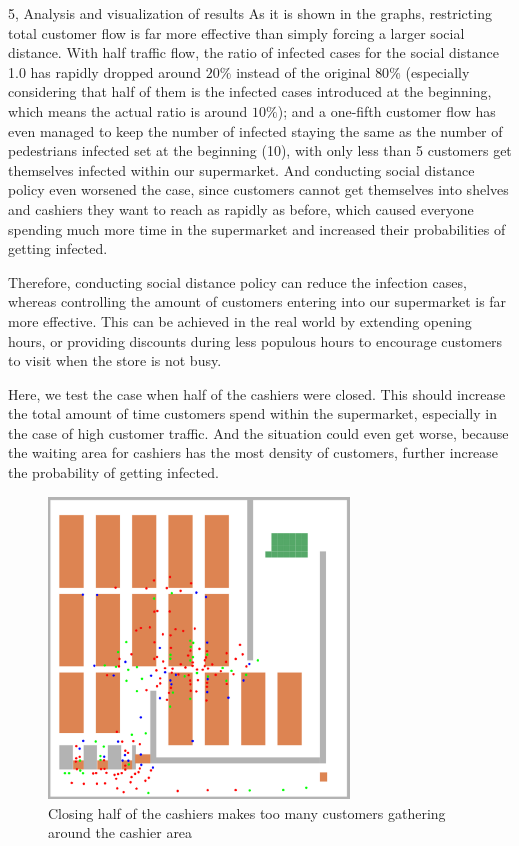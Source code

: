 \documentclass[10pt,a4paper]{article}
\begin{document}
\begin{task}{5, Analysis and visualization of results}
As it is shown in the graphs, restricting total customer flow is far more effective than simply forcing a larger social distance. With half traffic flow, the ratio of infected cases for the social distance 1.0 has rapidly dropped around $20\%$ instead of the original $80\%$ (especially considering that half of them is the infected cases introduced at the beginning, which means the actual ratio is around $10\%$); and a one-fifth customer flow has even managed to keep the number of infected staying the same as the number of pedestrians infected set at the beginning (10), with only less than 5 customers get themselves infected within our supermarket. And conducting social distance policy even worsened the case, since customers cannot get themselves into shelves and cashiers they want to reach as rapidly as before, which caused everyone spending much more time in the supermarket and increased their probabilities of getting infected.

Therefore, conducting social distance policy can reduce the infection cases, whereas controlling the amount of customers entering into our supermarket is far more effective. This can be achieved in the real world by extending opening hours, or providing discounts during less populous hours to encourage customers to visit when the store is not busy.

\bigskip


Here, we test the case when half of the cashiers were closed. This should increase the total amount of time customers spend within the supermarket, especially in the case of high customer traffic. And the situation could even get worse, because the waiting area for cashiers has the most density of customers, further increase the probability of getting infected.


\begin{figure}[H]
    \includegraphics[width=8cm]{images/bonus_1.png}
    \centering
    \caption{Closing half of the cashiers makes too many customers gathering around the cashier area}
    \label{bonus1-1}
\end{figure}



\end{task}
\end{document}
